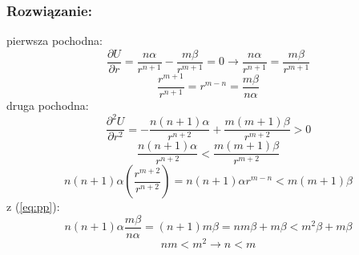 \subsubsection*{Rozwiązanie:}
pierwsza pochodna:
\begin{equation}
\frac{\partial U}{\partial r} = \frac{n\alpha}{r^{n+1}} - \frac{m\beta}{r^{m+1}}=0 \rightarrow \frac{n\alpha}{r^{n+1}} = \frac{m\beta}{r^{m+1}}
\end{equation}
\begin{equation}
\label{eq:pp}
\frac{r^{m+1}}{r^{n+1}} = r^{m-n} = \frac{m\beta}{n\alpha}
\end{equation}
druga pochodna:
\begin{equation}
\frac{\partial^2 U}{\partial r^2} = - \frac{n(n+1)\alpha}{r^{n+2}} + \frac{m(m+1)\beta}{r^{m+2}} > 0
\end{equation}
\[ \frac{n(n+1)\alpha}{r^{n+2}} < \frac{m(m+1)\beta}{r^{m+2}} \]
\[n(n+1)\alpha \left( \frac{r^{m+2}}{r^{n+2}} \right) = n(n+1)\alpha r^{m-n} < m(m+1)\beta\]
z (\ref{eq:pp}):
\[ n(n+1)\alpha \frac{m\beta}{n\alpha} = (n+1)m\beta = nm\beta + m\beta < m^2\beta + m\beta\]
\[nm < m^2 \rightarrow n<m\]
\hrulefill
\hrulefill
